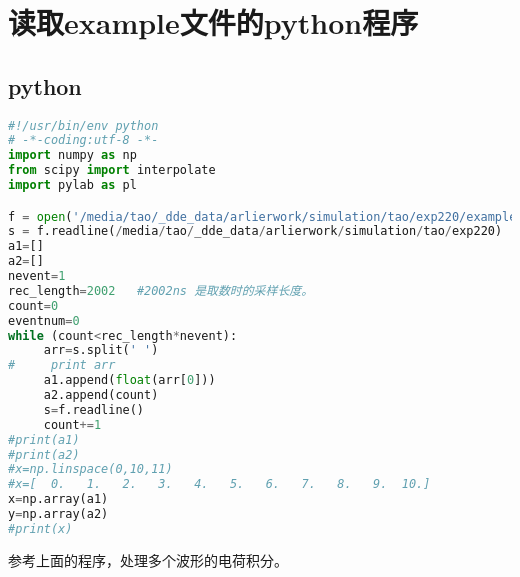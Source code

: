 \documentclass{elegantbook}
\begin{document}
\nocite{EINAV2010,Havrylchyk2018} 

%
%

\appendix
\chapter{读取example文件的python程序}

\section{python}
\begin{lstlisting}[caption={A simple listing.}, label={lst:simple},language=Python]
#!/usr/bin/env python
# -*-coding:utf-8 -*-
import numpy as np
from scipy import interpolate
import pylab as pl

f = open('/media/tao/_dde_data/arlierwork/simulation/tao/exp220/example.lvm') #换成你自己的文件名
s = f.readline(/media/tao/_dde_data/arlierwork/simulation/tao/exp220)
a1=[]
a2=[]
nevent=1
rec_length=2002   #2002ns 是取数时的采样长度。
count=0
eventnum=0
while (count<rec_length*nevent):  
     arr=s.split(' ')
#     print arr
     a1.append(float(arr[0]))
     a2.append(count)
     s=f.readline()
     count+=1
#print(a1)
#print(a2)
#x=np.linspace(0,10,11)
#x=[  0.   1.   2.   3.   4.   5.   6.   7.   8.   9.  10.]
x=np.array(a1)
y=np.array(a2)
#print(x)


\end{lstlisting}

参考上面的程序，处理多个波形的电荷积分。
\end{document}
